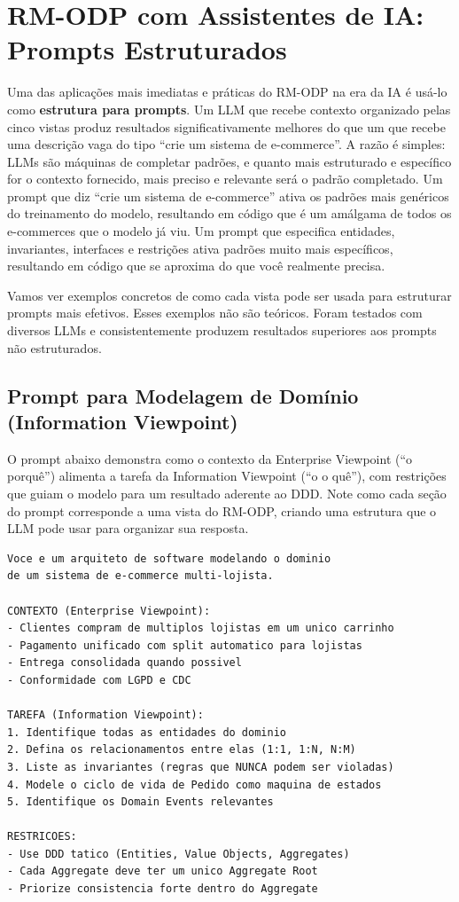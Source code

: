 \section{RM-ODP com Assistentes de IA: Prompts Estruturados}

Uma das aplicações mais imediatas e práticas do RM-ODP na era da IA é usá-lo
como \textbf{estrutura para prompts}. Um LLM que recebe contexto organizado
pelas cinco vistas produz resultados significativamente melhores do que um
que recebe uma descrição vaga do tipo ``crie um sistema de e-commerce''. A razão
é simples: LLMs são máquinas de completar padrões, e quanto mais estruturado e
específico for o contexto fornecido, mais preciso e relevante será o padrão
completado. Um prompt que diz ``crie um sistema de e-commerce'' ativa os padrões
mais genéricos do treinamento do modelo, resultando em código que é um amálgama
de todos os e-commerces que o modelo já viu. Um prompt que especifica entidades,
invariantes, interfaces e restrições ativa padrões muito mais específicos,
resultando em código que se aproxima do que você realmente precisa.

Vamos ver exemplos concretos de como cada vista pode ser usada para estruturar
prompts mais efetivos. Esses exemplos não são teóricos. Foram testados
com diversos LLMs e consistentemente produzem resultados superiores aos prompts
não estruturados.

\subsection{Prompt para Modelagem de Domínio (Information Viewpoint)}

O prompt abaixo demonstra como o contexto da Enterprise Viewpoint (``o porquê'')
alimenta a tarefa da Information Viewpoint (``o o quê''), com restrições que
guiam o modelo para um resultado aderente ao DDD. Note como cada seção do prompt
corresponde a uma vista do RM-ODP, criando uma estrutura que o LLM pode usar
para organizar sua resposta.

\begin{lstlisting}[language={}, caption={Prompt estruturado usando a Information Viewpoint}]
Voce e um arquiteto de software modelando o dominio
de um sistema de e-commerce multi-lojista.

CONTEXTO (Enterprise Viewpoint):
- Clientes compram de multiplos lojistas em um unico carrinho
- Pagamento unificado com split automatico para lojistas
- Entrega consolidada quando possivel
- Conformidade com LGPD e CDC

TAREFA (Information Viewpoint):
1. Identifique todas as entidades do dominio
2. Defina os relacionamentos entre elas (1:1, 1:N, N:M)
3. Liste as invariantes (regras que NUNCA podem ser violadas)
4. Modele o ciclo de vida de Pedido como maquina de estados
5. Identifique os Domain Events relevantes

RESTRICOES:
- Use DDD tatico (Entities, Value Objects, Aggregates)
- Cada Aggregate deve ter um unico Aggregate Root
- Priorize consistencia forte dentro do Aggregate
\end{lstlisting}

